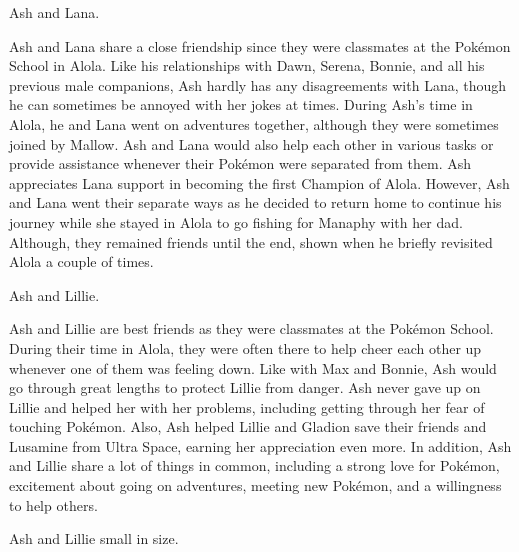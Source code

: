 \documentclass[a4paper,12pt]{article}
\begin{document}
Ash and Lana.\\ \par \vspace{0.5cm}

Ash and Lana share a close friendship since they were classmates at the Pokémon School in Alola. Like his relationships with Dawn, Serena, Bonnie, and all his previous male companions, Ash hardly has any disagreements with Lana, though he can sometimes be annoyed with her jokes at times. During Ash's time in Alola, he and Lana went on adventures together, although they were sometimes joined by Mallow. Ash and Lana would also help each other in various tasks or provide assistance whenever their Pokémon were separated from them. Ash appreciates Lana support in becoming the first Champion of Alola. However, Ash and Lana went their separate ways as he decided to return home to continue his journey while she stayed in Alola to go fishing for Manaphy with her dad. Although, they remained friends until the end, shown when he briefly revisited Alola a couple of times.\\ \par \vspace{0.5cm}

Ash and Lillie.\\ \par \vspace{0.5cm}

Ash and Lillie are best friends as they were classmates at the Pokémon School. During their time in Alola, they were often there to help cheer each other up whenever one of them was feeling down. Like with Max and Bonnie, Ash would go through great lengths to protect Lillie from danger. Ash never gave up on Lillie and helped her with her problems, including getting through her fear of touching Pokémon. Also, Ash helped Lillie and Gladion save their friends and Lusamine from Ultra Space, earning her appreciation even more. In addition, Ash and Lillie share a lot of things in common, including a strong love for Pokémon, excitement about going on adventures, meeting new Pokémon, and a willingness to help others.\\ \par \vspace{0.5cm}

Ash and Lillie small in size.\\ \par \vspace{0.5cm}
\end{document}
